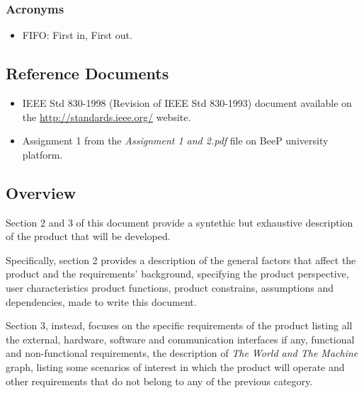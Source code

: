 		\subsubsection{Acronyms}
		\begin{itemize}
			\item FIFO: First in, First out.
		\end{itemize}
	\subsection{Reference Documents}
	\begin{itemize}
		\item IEEE Std 830-1998 (Revision of IEEE Std 830-1993) document available on the \url{http://standards.ieee.org/} website.
		\item Assignment 1 from the \emph{Assignment 1 and 2.pdf} file on BeeP university platform.
	\end{itemize}
	\subsection{Overview}
		Section 2 and 3 of this document provide a syntethic but exhaustive description of the product that will be developed.
				
		Specifically, section 2 provides a description of the general factors that affect the product and the requirements' background, specifying the product perspective, user characteristics product functions, product constrains, assumptions and dependencies, made to write this document.
		
		Section 3, instead, focuses on the specific requirements of the product listing all the external, hardware, software and communication interfaces if any, functional and non-functional requirements, the description of \emph{The World and The Machine} graph, listing some scenarios of interest in which the product will operate and other requirements that do not belong to any of the previous category. 
	
	
